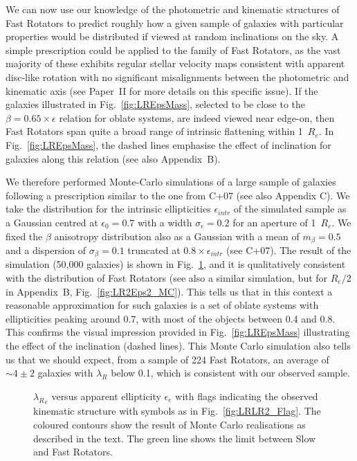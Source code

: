 \documentclass[useAMS,usenatbib,usegraphicx]{mn2e}
\begin{document}
We can now use our knowledge of the photometric and kinematic structures of Fast Rotators to
predict roughly how a given sample of galaxies with particular properties would 
be distributed if viewed at random inclinations on the sky. A simple
prescription could be applied to the family of Fast Rotators, 
as the vast majority of these exhibits regular stellar velocity maps consistent with apparent disc-like rotation
with no significant misalignments between the photometric and kinematic axis
(see Paper~II for more details on this specific issue). If
the galaxies illustrated in Fig.~\ref{fig:LREpsMass}, selected to be close to the $\beta
= 0.65 \times \epsilon$ relation for oblate systems, are indeed viewed near edge-on, 
then Fast Rotators span quite a broad range of intrinsic flattening within 1~$R_e$. 
In Fig.~\ref{fig:LREpsMass}, the dashed lines emphasise
the effect of inclination for galaxies along this relation (see also Appendix~B). 

We therefore performed Monte-Carlo simulations of a large sample
of galaxies following a prescription similar to the one from C+07 (see
also Appendix C). We take the distribution for 
the intrinsic ellipticities $\epsilon_{intr}$ of the simulated sample
as a Gaussian centred at $\epsilon_{0} = 0.7$ with a width $\sigma_{\epsilon} = 0.2$ for an aperture
of 1~$R_e$. We fixed the $\beta$ anisotropy
distribution also as a Gaussian with a mean of $m_{\beta} = 0.5$ and a dispersion of $\sigma_{\beta}
= 0.1$ truncated at $0.8 \times \epsilon_{intr}$ (see C+07).
The result of the simulation (50,000 galaxies) is shown in Fig.~\ref{fig:LREps_MC}, and
it is qualitatively consistent with the distribution of Fast Rotators (see also
a similar simulation, but for $R_e/2$ in Appendix~B, Fig.~\ref{fig:LR2Eps2_MC}).
This tells us that in this context a reasonable approximation for such galaxies is a
set of oblate systems with ellipticities peaking around 0.7, with most of the
objects between 0.4 and 0.8. This confirms the visual impression provided in Fig.~\ref{fig:LREpsMass}
illustrating the effect of the inclination (dashed lines).
This Monte Carlo simulation also tells us that we should expect, from a sample
of 224 Fast Rotators, an average of $\sim 4\pm2$ galaxies with $\lambda_R$ below
0.1, which is consistent with our observed sample.
\begin{figure}
\centering
{} 
\caption{${\lambda_R}_e$ versus apparent ellipticity $\epsilon_e$ with flags
indicating the observed kinematic structure with symbols as in Fig.~\ref{fig:LRLR2_Flag}. The coloured
contours show the result of Monte Carlo realisations as described in the text.
The green line shows the limit between Slow and Fast Rotators.}
\label{fig:LREps_MC}
\end{figure}
\end{document}
